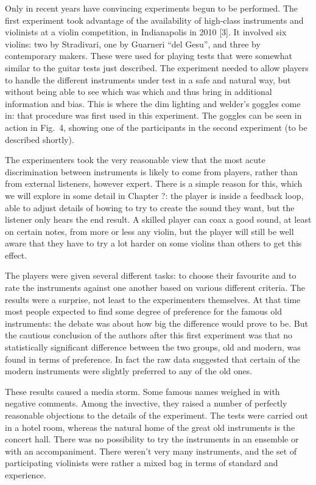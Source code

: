   Only in recent years have convincing experiments begun to be performed. The 
  first experiment took advantage of the availability of high-class instruments 
  and violinists at a violin competition, in Indianapolis in 2010 [3]. It 
  involved six violins: two by Stradivari, one by Guarneri “del Gesu”, and 
  three by contemporary makers. These were used for playing tests that were 
  somewhat similar to the guitar tests just described. The experiment needed to 
  allow players to handle the different instruments under test in a safe and 
  natural way, but without being able to see which was which and thus bring in 
  additional information and bias. This is where the dim lighting and welder’s 
  goggles come in: that procedure was first used in this experiment. The 
  goggles can be seen in action in Fig.\ 4, showing one of the participants in 
  the second experiment (to be described shortly). 

  The experimenters took the very reasonable view that the most acute 
  discrimination between instruments is likely to come from players, rather 
  than from external listeners, however expert. There is a simple reason for 
  this, which we will explore in some detail in Chapter ?: the player is inside 
  a feedback loop, able to adjust details of bowing to try to create the sound 
  they want, but the listener only hears the end result. A skilled player can 
  coax a good sound, at least on certain notes, from more or less any violin, 
  but the player will still be well aware that they have to try a lot harder on 
  some violins than others to get this effect. 

  The players were given several different tasks: to choose their favourite and 
  to rate the instruments against one another based on various different 
  criteria. The results were a surprise, not least to the experimenters 
  themselves. At that time most people expected to find some degree of 
  preference for the famous old instruments: the debate was about how big the 
  difference would prove to be. But the cautious conclusion of the authors 
  after this first experiment was that no statistically significant difference 
  between the two groups, old and modern, was found in terms of preference. In 
  fact the raw data suggested that certain of the modern instruments were 
  slightly preferred to any of the old ones. 

  These results caused a media storm. Some famous names weighed in with 
  negative comments. Among the invective, they raised a number of perfectly 
  reasonable objections to the details of the experiment. The tests were 
  carried out in a hotel room, whereas the natural home of the great old 
  instruments is the concert hall. There was no possibility to try the 
  instruments in an ensemble or with an accompaniment. There weren’t very many 
  instruments, and the set of participating violinists were rather a mixed bag 
  in terms of standard and experience. 

